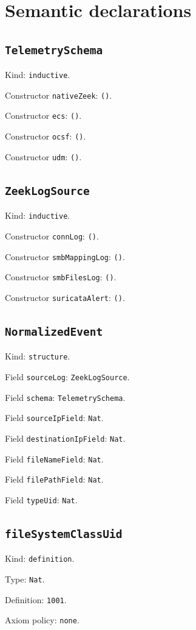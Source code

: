 \documentclass[11pt]{article}
\begin{document}
\section*{Semantic declarations}
\subsection*{\texttt{TelemetrySchema}}
\noindent Kind: \texttt{inductive}.\par
\noindent Constructor \texttt{nativeZeek}: \texttt{()}.\par
\noindent Constructor \texttt{ecs}: \texttt{()}.\par
\noindent Constructor \texttt{ocsf}: \texttt{()}.\par
\noindent Constructor \texttt{udm}: \texttt{()}.\par
\subsection*{\texttt{ZeekLogSource}}
\noindent Kind: \texttt{inductive}.\par
\noindent Constructor \texttt{connLog}: \texttt{()}.\par
\noindent Constructor \texttt{smbMappingLog}: \texttt{()}.\par
\noindent Constructor \texttt{smbFilesLog}: \texttt{()}.\par
\noindent Constructor \texttt{suricataAlert}: \texttt{()}.\par
\subsection*{\texttt{NormalizedEvent}}
\noindent Kind: \texttt{structure}.\par
\noindent Field \texttt{sourceLog}: \texttt{ZeekLogSource}.\par
\noindent Field \texttt{schema}: \texttt{TelemetrySchema}.\par
\noindent Field \texttt{sourceIpField}: \texttt{Nat}.\par
\noindent Field \texttt{destinationIpField}: \texttt{Nat}.\par
\noindent Field \texttt{fileNameField}: \texttt{Nat}.\par
\noindent Field \texttt{filePathField}: \texttt{Nat}.\par
\noindent Field \texttt{typeUid}: \texttt{Nat}.\par
\subsection*{\texttt{fileSystemClassUid}}
\noindent Kind: \texttt{definition}.\par
\noindent Type: \texttt{Nat}.\par
\noindent Definition: \texttt{1001}.\par
\noindent Axiom policy: \texttt{none}.\par
\end{document}
